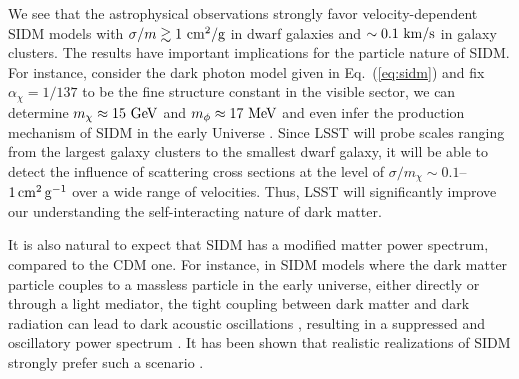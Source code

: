 We see that the astrophysical observations strongly favor velocity-dependent SIDM models with $\sigma/m\gtrsim 1~{\rm cm^2/g}$ in dwarf galaxies and $\sim0.1~{\rm km/s}$ in galaxy clusters. The results have important implications for the particle nature of SIDM. For instance, consider the dark photon model given in Eq.~(\ref{eq:sidm}) and fix $\alpha_\chi=1/137$ to be the fine structure constant in the visible sector, we can determine $m_\chi\approx15~{\rm GeV}$ and $m_\phi\approx17~{\rm MeV}$ \citep{Kaplinghat:2015aga} and even infer the production mechanism of SIDM in the early Universe \citep{Huo:2017vef}. Since LSST will probe scales ranging from the largest galaxy clusters to the smallest dwarf galaxy, it will be able to detect the influence of scattering cross sections at the level of $\sigma/m_\chi \sim 0.1$--$1 \mathrm{\,cm}^2 \mathrm{\,g}^{-1}$ over a wide range of velocities. Thus, LSST will significantly improve our understanding the self-interacting nature of dark matter. 







It is also natural to expect that SIDM has a modified matter power spectrum, compared to the CDM one. For instance, in SIDM models where the dark matter particle couples to a massless particle in the early universe, either directly or through a light mediator, the tight coupling between dark matter and dark radiation can lead to dark acoustic oscillations \citep{Cyr-Racine:2013ab,Cyr-Racine:2013fsa}, resulting in a suppressed and oscillatory power spectrum \citep[\eg][]{1992ApJ...398...43C,Boehm:2001hm,Boehm:2004th,Feng:2009mn,Aarssen:2012fx}. It has been shown that realistic realizations of SIDM strongly prefer such a scenario \citep{ Huo:2017vef}.

